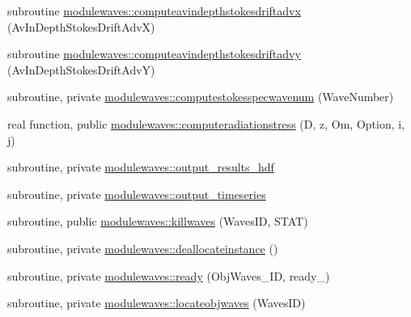 \begin{DoxyCompactItemize}
\item 
subroutine \mbox{\hyperlink{namespacemodulewaves_a98626046a012cf7b692f0a35191e231e}{modulewaves\+::computeavindepthstokesdriftadvx}} (Av\+In\+Depth\+Stokes\+Drift\+AdvX)
\item 
subroutine \mbox{\hyperlink{namespacemodulewaves_a2c6ef8f51e579b38f56e8b4ec076f0aa}{modulewaves\+::computeavindepthstokesdriftadvy}} (Av\+In\+Depth\+Stokes\+Drift\+AdvY)
\item 
subroutine, private \mbox{\hyperlink{namespacemodulewaves_ad109b1bb3a215d9d37fee5e04428decc}{modulewaves\+::computestokesspecwavenum}} (Wave\+Number)
\item 
real function, public \mbox{\hyperlink{namespacemodulewaves_a5f64bacf936301755ac7472613db2a12}{modulewaves\+::computeradiationstress}} (D, z, Om, Option, i, j)
\item 
subroutine, private \mbox{\hyperlink{namespacemodulewaves_a89f925f57b1b3b8af0ce6bb51398f224}{modulewaves\+::output\+\_\+results\+\_\+hdf}}
\item 
subroutine, private \mbox{\hyperlink{namespacemodulewaves_ad7f81476715cc55364572aacbf0b2696}{modulewaves\+::output\+\_\+timeseries}}
\item 
subroutine, public \mbox{\hyperlink{namespacemodulewaves_ac7cfc1f43634cac51c36130e5d101c5d}{modulewaves\+::killwaves}} (Waves\+ID, S\+T\+AT)
\item 
subroutine, private \mbox{\hyperlink{namespacemodulewaves_ae0f81c5ccbee665024d621b4578f59ed}{modulewaves\+::deallocateinstance}} ()
\item 
subroutine, private \mbox{\hyperlink{namespacemodulewaves_a15beb6e5dff252a4c77c47d43f9b6385}{modulewaves\+::ready}} (Obj\+Waves\+\_\+\+ID, ready\+\_\+)
\item 
subroutine, private \mbox{\hyperlink{namespacemodulewaves_a0b543189e013d4ce00f78f873ab7f481}{modulewaves\+::locateobjwaves}} (Waves\+ID)
\end{DoxyCompactItemize}
